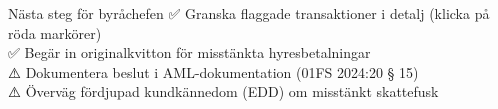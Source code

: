 \documentclass[10pt]{beamer}
\begin{document}
\begin{frame}[label=penningflodes]
  \vspace{0.4cm}
  \begin{block}{Nästa steg för byråchefen}
    \footnotesize
    ✅ Granska flaggade transaktioner i detalj (klicka på röda markörer)\\
    ✅ Begär in originalkvitton för misstänkta hyresbetalningar\\
    ⚠️ Dokumentera beslut i AML-dokumentation (01FS 2024:20 § 15)\\
    ⚠️ Överväg fördjupad kundkännedom (EDD) om misstänkt skattefusk
  \end{block}
  
  \vspace{0.5cm}
  \begin{flushright}
    \hyperlink{riskbesked}{}
  \end{flushright}
\end{frame}
\end{document}
